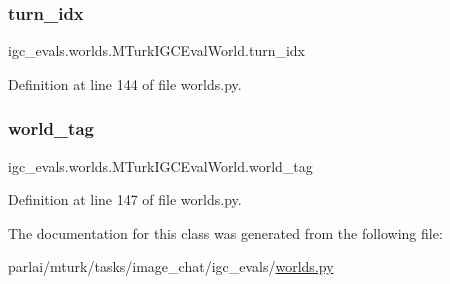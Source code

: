 \subsubsection{\texorpdfstring{turn\+\_\+idx}{turn\_idx}}
{\footnotesize\ttfamily igc\+\_\+evals.\+worlds.\+M\+Turk\+I\+G\+C\+Eval\+World.\+turn\+\_\+idx}



Definition at line 144 of file worlds.\+py.

\mbox{\label{classigc__evals_1_1worlds_1_1MTurkIGCEvalWorld_a71ee5ba95de2b115ad926db20bf88ae4}} 
\subsubsection{\texorpdfstring{world\+\_\+tag}{world\_tag}}
{\footnotesize\ttfamily igc\+\_\+evals.\+worlds.\+M\+Turk\+I\+G\+C\+Eval\+World.\+world\+\_\+tag}



Definition at line 147 of file worlds.\+py.



The documentation for this class was generated from the following file\+:\begin{DoxyCompactItemize}
\item 
parlai/mturk/tasks/image\+\_\+chat/igc\+\_\+evals/\hyperlink{parlai_2mturk_2tasks_2image__chat_2igc__evals_2worlds_8py}{worlds.\+py}\end{DoxyCompactItemize}
